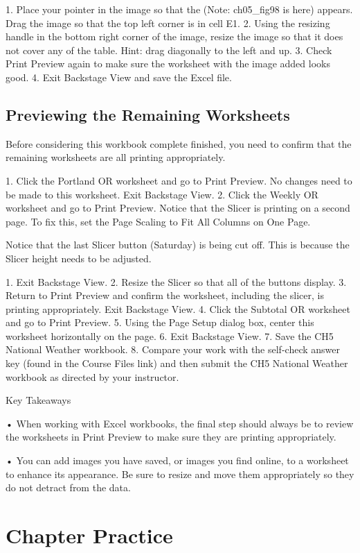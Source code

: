 1. Place your pointer in the image so that the  (Note: ch05\_fig98 is here)   appears. Drag the image so that the top left corner
is in cell E1.
2. Using the resizing handle in the bottom right corner of the image, resize the image so that it
does not cover any of the table. Hint: drag diagonally to the left and up.
3. Check Print Preview again to make sure the worksheet with the image added looks good.
4. Exit Backstage View and save the Excel file.

\subsection{Previewing the Remaining Worksheets}

Before considering this workbook complete finished, you need to confirm that the remaining
worksheets are all printing appropriately.

1. Click the Portland OR worksheet and go to Print Preview. No changes need to be made to this
worksheet. Exit Backstage View.
2. Click the Weekly OR worksheet and go to Print Preview. Notice that the Slicer is printing on a
second page. To fix this, set the Page Scaling to Fit All Columns on One Page.

Notice that the last Slicer button (Saturday) is being cut off. This is because the Slicer height needs to
be adjusted.

1. Exit Backstage View.
2. Resize the Slicer so that all of the buttons display.
3. Return to Print Preview and confirm the worksheet, including the slicer, is printing
appropriately. Exit Backstage View.
4. Click the Subtotal OR worksheet and go to Print Preview.
5. Using the Page Setup dialog box, center this worksheet horizontally on the page.
6. Exit Backstage View.
7. Save the CH5 National Weather workbook.
8. Compare your work with the self-check answer key (found in the Course Files link) and then
submit the CH5 National Weather workbook as directed by your instructor.


Key Takeaways


• When working with Excel workbooks, the final step should always be to review the worksheets in Print
Preview to make sure they are printing appropriately.

• You can add images you have saved, or images you find online, to a worksheet to enhance its appearance. Be
sure to resize and move them appropriately so they do not detract from the data.



\section{Chapter Practice}




